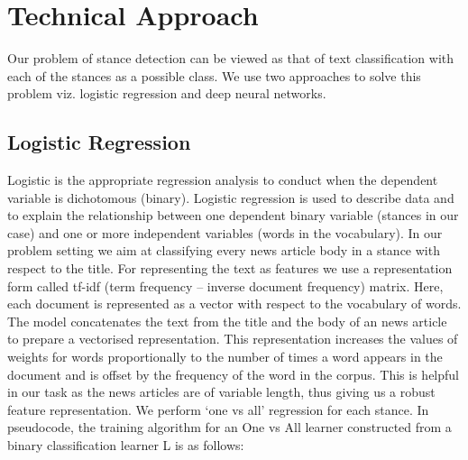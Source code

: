 \documentclass[11.5pt]{article}
\begin{document}
\section{Technical Approach}

Our problem of stance detection can be viewed as that of text classification with each of the stances as a possible class. We use two approaches to solve this problem viz. logistic regression and deep neural networks.

\subsection{Logistic Regression}

Logistic is the appropriate regression analysis to conduct when the dependent variable is dichotomous (binary). Logistic regression is used to describe data and to explain the relationship between one dependent binary variable (stances in our case) and one or more independent variables (words in the vocabulary). 
In our problem setting we aim at classifying every news article body in a stance with respect to the title. For representing the text as features we use a representation form called tf-idf (term frequency – inverse document frequency) matrix. Here, each document is represented as a vector with respect to the vocabulary of words. The model concatenates the text from the title and the body of an news article to prepare a vectorised representation. This representation increases the values of weights for words proportionally to the number of times a word appears in the document and is offset by the frequency of the word in the corpus. This is helpful in our task as the news articles are of variable length, thus giving us a robust feature representation. We perform ‘one vs all’ regression for each stance. 
In pseudocode, the training algorithm for an One vs All learner constructed from a binary classification learner L is as follows:
\end{document}
